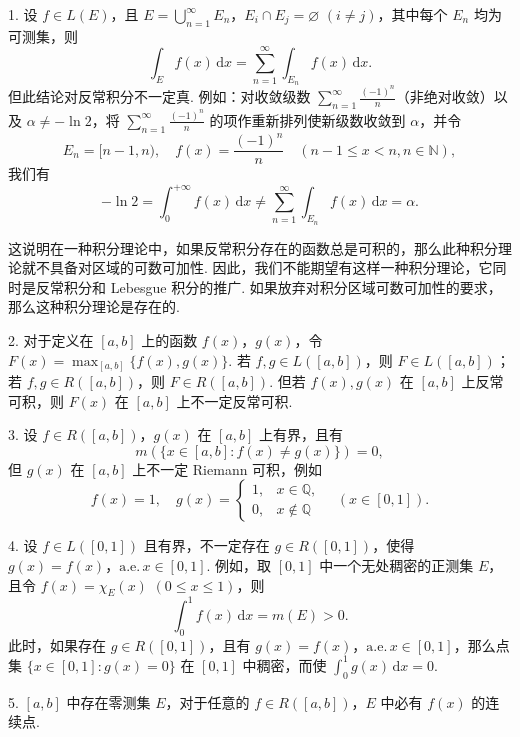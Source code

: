 \documentclass[../../main.tex]{subfiles}
\begin{document}
\begin{remark}
1. 设 \( f \in L(E) \)，且 \( E = \bigcup_{n = 1}^{\infty} E_n \)，\( E_i \cap E_j = \varnothing \) \( (i \neq j) \)，其中每个 \( E_n \) 均为可测集，则
\[
\int_E f(x) \, \mathrm{d}x = \sum_{n = 1}^{\infty} \int_{E_n} f(x) \, \mathrm{d}x.
\]
但此结论对反常积分不一定真. 例如：对收敛级数 \( \sum_{n = 1}^{\infty} \frac{(-1)^n}{n} \)（非绝对收敛）以及 \( \alpha \neq -\ln 2 \)，将 \( \sum_{n = 1}^{\infty} \frac{(-1)^n}{n} \) 的项作重新排列使新级数收敛到 \( \alpha \)，并令
\[
E_n = [n - 1, n), \quad f(x) = \frac{(-1)^n}{n} \quad (n - 1 \leqslant  x < n, n \in \mathbb{N}),
\]
我们有
\[
-\ln 2 = \int_0^{+\infty} f(x) \, \mathrm{d}x \neq \sum_{n = 1}^{\infty} \int_{E_n} f(x) \, \mathrm{d}x = \alpha.
\]

这说明在一种积分理论中，如果反常积分存在的函数总是可积的，那么此种积分理论就不具备对区域的可数可加性. 因此，我们不能期望有这样一种积分理论，它同时是反常积分和 Lebesgue 积分的推广. 如果放弃对积分区域可数可加性的要求，那么这种积分理论是存在的.

2. 对于定义在 \( [a, b] \) 上的函数 \( f(x) \)，\( g(x) \)，令 \( F(x) = \max_{[a, b]} \{ f(x), g(x) \} \). 若 \( f, g \in L([a, b]) \)，则 \( F \in L([a, b]) \)；若 \( f, g \in R([a, b]) \)，则 \( F \in R([a, b]) \). 但若 \( f(x), g(x) \) 在 \( [a, b] \) 上反常可积，则 \( F(x) \) 在 \( [a, b] \) 上不一定反常可积.

3. 设 \( f \in R([a, b]) \)，\( g(x) \) 在 \( [a, b] \) 上有界，且有
\[
m(\{ x \in [a, b] : f(x) \neq g(x) \}) = 0,
\]
但 \( g(x) \) 在 \( [a, b] \) 上不一定 Riemann 可积，例如
\[
f(x) = 1, \quad g(x) = 
\begin{cases} 
1, & x \in \mathbb{Q}, \\
0, & x \notin \mathbb{Q}
\end{cases} \quad (x \in [0, 1]).
\]

4. 设 \( f \in L([0, 1]) \) 且有界，不一定存在 \( g \in R([0, 1]) \)，使得 \( g(x) = f(x) \)，\(\text{a.e.}\, x \in [0, 1] \). 例如，取 \( [0, 1] \) 中一个无处稠密的正测集 \( E \)，且令 \( f(x) = \chi_E(x) \) \( (0 \leqslant  x \leqslant  1) \)，则
\[
\int_0^1 f(x) \, \mathrm{d}x = m(E) > 0.
\]
此时，如果存在 \( g \in R([0, 1]) \)，且有 \( g(x) = f(x) \)，\(\text{a.e.}\, x \in [0, 1] \)，那么点集 \( \{ x \in [0, 1] : g(x) = 0 \} \) 在 \( [0, 1] \) 中稠密，而使 \( \int_0^1 g(x) \, \mathrm{d}x = 0 \).

5. \( [a, b] \) 中存在零测集 \( E \)，对于任意的 \( f \in R([a, b]) \)，\( E \) 中必有 \( f(x) \) 的连续点.


\end{remark}
\end{document}
